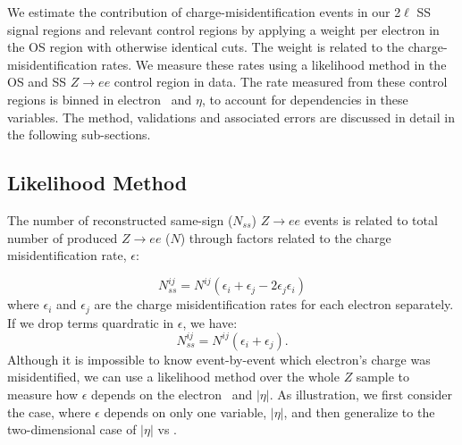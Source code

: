 We estimate the contribution of charge-misidentification events in our 2$\ell$ SS signal regions and relevant control regions by applying a weight per electron in the OS region with otherwise identical cuts. The weight is related to the charge-misidentification rates. We measure these rates using a likelihood method in the OS and SS $Z\rightarrow ee$ control region in data. The rate measured from these control regions is binned in electron \pt\ and $\eta$, to account for dependencies in these variables. The method, validations and associated errors are discussed in detail in the following sub-sections.


\subsection{Likelihood Method}

The number of reconstructed same-sign ($N_{ss}$) $Z\rightarrow ee$ events is related to total number of produced $Z\rightarrow ee$ ($N$) through factors related to the charge misidentification rate, $\epsilon$: 

\begin{equation}
N^{ij}_{ss} = N^{ij}(\epsilon_i + \epsilon_j - 2\epsilon_j\epsilon_i)
\end{equation}
where $\epsilon_i$ and $\epsilon_j$ are the charge misidentification rates for each electron separately. If we drop terms quardratic in $\epsilon$, we have:
\begin{equation}
N^{ij}_{ss}=N^{ij}(\epsilon_i+\epsilon_j).
\end{equation}
Although it is impossible to know event-by-event which electron's charge was misidentified, we can use a likelihood method over the whole $Z$ sample to measure how $\epsilon$ depends on the electron \pt\ and $|\eta|$. As illustration, we first consider the case, where $\epsilon$ depends on only one variable, $|\eta|$, and then generalize to the two-dimensional case of $|\eta|$ vs \pt. 

